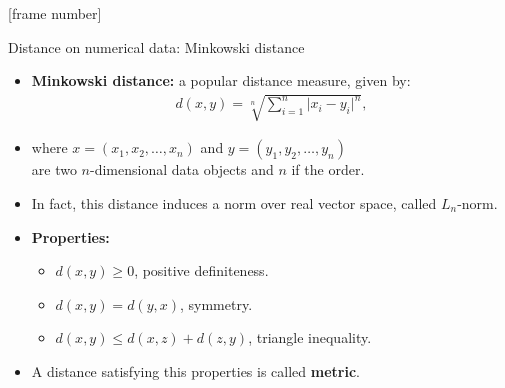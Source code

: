 \documentclass[aspectratio=169,t]{beamer}
\begin{document}
  {
    [frame number]
    \begin{frame}{Distance on numerical data: Minkowski distance}
    \begin{itemize}
      \item \textbf{Minkowski distance:} a popular distance measure, given by:
            \begin{align}
              d(x,y) = \sqrt[n]{\sum_{i=1}^{n} \vert x_i-y_i \vert^n},
            \end{align}
      \item where $x = (x_1,x_2, \ldots, x_n)$ and $y = (y_1,y_2,\ldots,y_n)$ \\ are two $n$-dimensional data objects and $n$ if the order.
      \item In fact, this distance induces a norm over real vector space, called $L_n$-norm.
      \item \textbf{Properties:}
      \begin{itemize}
          \item $d(x,y) \geq 0$, positive definiteness.
          \item $d(x,y) = d(y,x)$, symmetry.
          \item $d(x,y) \leq d(x,z) + d(z,y)$, triangle inequality.
      \end{itemize}
      \item A distance satisfying this properties is called \textbf{metric}.
    \end{itemize}
    \end{frame}
  }
\end{document}
